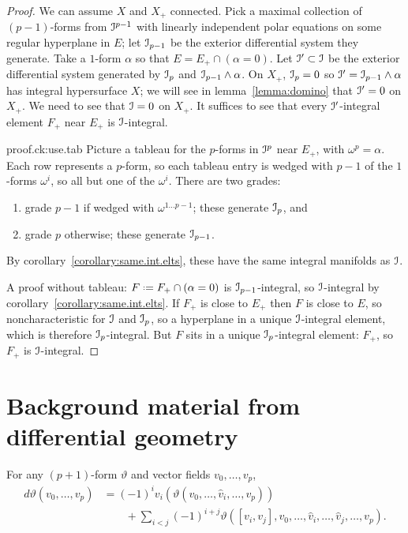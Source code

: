 \begin{proof}
We can assume \(X\) and \(X_+\) connected.
Pick a maximal collection of \((p-1)\)-forms from \(\mathcal{I}^{p-1}\) with linearly independent polar equations on some regular hyperplane in \(E\); let \(\mathcal{I}_{p-1}\) be the exterior differential system they generate.
Take a \(1\)-form \(\alpha\) so that \(E=E_+\cap(\alpha=0)\).
Let \(\mathcal{I}'\subset\mathcal{I}\) be the exterior differential system generated by \(\mathcal{I}_p\) and \(\mathcal{I}_{p-1}\wedge\alpha\).
On \(X_+\), \(\mathcal{I}_p=0\) so \(\mathcal{I}'=\mathcal{I}_{p-1}\wedge\alpha\) has integral hypersurface \(X\); we will see in lemma~\vref{lemma:domino} that \(\mathcal{I}'=0\) on \(X_+\).
We need to see that \(\mathcal{I}=0\) on \(X_+\).
It suffices to see that every \(\mathcal{I}'\)-integral element \(F_+\) near \(E_+\) is \(\mathcal{I}\)-integral.
\begin{answer}{proof.ck:use.tab}
Picture a tableau for the \(p\)-forms in \(\mathcal{I}^p\) near \(E_+\), with \(\omega^p=\alpha\).
Each row represents a \(p\)-form, so each tableau entry is wedged with \(p-1\) of the \(1\)-forms \(\omega^i\), so all but one of the \(\omega^i\). 
There are two grades: 
\begin{enumerate}
\item
grade \(p-1\) if wedged with \(\omega^{1\dots p-1}\); these generate \(\mathcal{I}_p\), and 
\item 
grade \(p\) otherwise; these generate \(\mathcal{I}_{p-1}\).
\end{enumerate}
By corollary~\vref{corollary:same.int.elts}, these have the same integral manifolds as \(\mathcal{I}\).
\end{answer}
A proof without tableau: \(F\defeq F_+\cap(\alpha=0)\) is \(\mathcal{I}_{p-1}\)-integral, so \(\mathcal{I}\)-integral by corollary~\vref{corollary:same.int.elts}.
If \(F_+\) is close to \(E_+\) then \(F\) is close to \(E\), so noncharacteristic for \(\mathcal{I}\) and \(\mathcal{I}_p\), so a hyperplane in a unique \(\mathcal{I}\)-integral element, which is therefore \(\mathcal{I}_p\)-integral.
But \(F\) sits in a unique \(\mathcal{I}_p\)-integral element: \(F_+\), so \(F_+\) is \(\mathcal{I}\)-integral.
\end{proof}

\section{Background material from differential geometry}
\begin{lemma}\label{lemma:Cartan.family}
For any \((p+1)\)-form \(\vartheta\) and vector fields \(v_0,\dots,v_p\),
\begin{align*}
d\vartheta(v_0,\dots,v_p)
&=
(-1)^i v_i (\vartheta(v_0,\dots,\hat{v}_i,\dots,v_p))
\\
& \qquad +
\sum_{i < j} (-1)^{i+j} \vartheta([v_i,v_j],v_0,\dots,\hat{v}_i,\dots,\hat{v}_j,\dots,v_p).
\end{align*}
\end{lemma}


